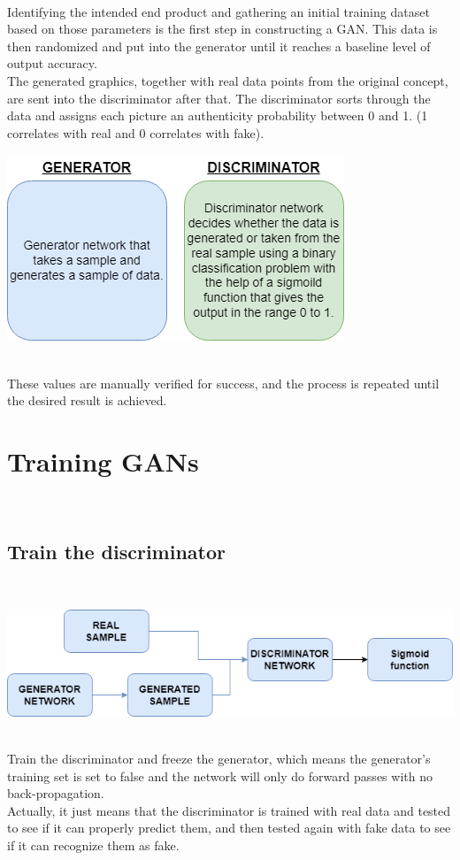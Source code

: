 \documentclass[14pt]{article}
\begin{document}
\\
Identifying the intended end product and gathering an initial training dataset based on those parameters is the first step in constructing a GAN. This data is then randomized and put into the generator until it reaches a baseline level of output accuracy.
\\
The generated graphics, together with real data points from the original concept, are sent into the discriminator after that. The discriminator sorts through the data and assigns each picture an authenticity probability between 0 and 1. (1 correlates with real and 0 correlates with fake).
\\
\begin{center}
    \includegraphics[width = 11 cm ]{4.png}
\end{center}
\\
These values are manually verified for success, and the process is repeated until the desired result is achieved.
\\
\section{Training GANs }
\\
\subsection{Train the discriminator}
\\
\begin{center}
    \includegraphics[width = 11 cm ]{5.png}
\end{center}
\\
Train the discriminator and freeze the generator, which means the generator's training set is set to false and the network will only do forward passes with no back-propagation.\\
Actually, it just means that the discriminator is trained with real data and tested to see if it can properly predict them, and then tested again with fake data to see if it can recognize them as fake.
\\
\end{document}
